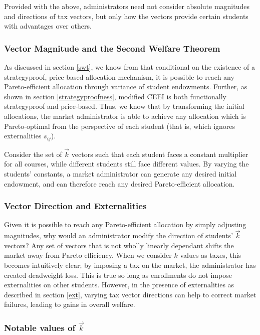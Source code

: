 \documentclass{article}
\begin{document}
Provided with the above, administrators need not consider absolute magnitudes and directions of tax vectors, but only how the vectors provide certain students with advantages over others.

\subsubsection{Vector Magnitude and the Second Welfare Theorem}

As discussed in section \ref{swt}, we know from \textcite{miralles2014} that conditional on the existence of a strategyproof, price-based allocation mechanism, it is possible to reach any Pareto-efficient allocation through variance of student endowments. Further, as shown in section \ref{strategyproofness}, modified CEEI is both functionally strategyproof and price-based. Thus, we know that by transforming the initial allocations, the market administrator is able to achieve any allocation which is Pareto-optimal from the perspective of each student (that is, which ignores externalities $s_{ij}$). 

Consider the set of $\vec{k}$ vectors such that each student faces a constant multiplier for all courses, while different students still face different values. By varying the students' constants, a market administrator can generate any desired initial endowment, and can therefore reach any desired Pareto-efficient allocation.


\subsubsection{Vector Direction and Externalities}

Given it is possible to reach any Pareto-efficient allocation by simply adjusting magnitudes, why would an administrator modify the direction of students' $\vec{k}$ vectors? Any set of vectors that is not wholly linearly dependant shifts the market away from Pareto efficiency. When we consider $k$ values as taxes, this becomes intuitively clear; by imposing a tax on the market, the administrator has created deadweight loss. This is true so long as enrollments do not impose externalities on other students. However, in the presence of externalities as described in section \ref{ext}, varying tax vector directions can help to correct market failures, leading to gains in overall welfare.

\subsubsection{Notable values of $\vec{k}$}
\end{document}
